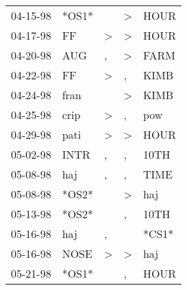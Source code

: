 \begin{supertabular}{p{0.07\textwidth}p{0.06\textwidth}p{0.02\textwidth}p{0.02\textwidth}p{0.06\textwidth}}
          04-15-98\textsuperscript{} &                            *OS1* &                  &     \textgreater &           HOUR\textsuperscript{} \\
          04-17-98\textsuperscript{} &             FF\textsuperscript{} &     \textgreater &     \textgreater &           HOUR\textsuperscript{} \\
          04-20-98\textsuperscript{} &            AUG\textsuperscript{} &                , &     \textgreater &           FARM\textsuperscript{} \\
          04-22-98\textsuperscript{} &             FF\textsuperscript{} &     \textgreater &                , &           KIMB\textsuperscript{} \\
          04-24-98\textsuperscript{} &           fran\textsuperscript{} &                  &     \textgreater &           KIMB\textsuperscript{} \\
          04-25-98\textsuperscript{} &           crip\textsuperscript{} &     \textgreater &                , &            pow\textsuperscript{} \\
          04-29-98\textsuperscript{} &           pati\textsuperscript{} &     \textgreater &     \textgreater &           HOUR\textsuperscript{} \\
          05-02-98\textsuperscript{} &           INTR\textsuperscript{} &                , &                , &           10TH\textsuperscript{} \\
          05-08-98\textsuperscript{} &            haj\textsuperscript{} &                , &                , &           TIME\textsuperscript{} \\
          05-08-98\textsuperscript{} &                            *OS2* &                  &     \textgreater &            haj\textsuperscript{} \\
          05-13-98\textsuperscript{} &                            *OS2* &                  &                , &           10TH\textsuperscript{} \\
          05-16-98\textsuperscript{} &            haj\textsuperscript{} &                , &                  &                            *CS1* \\
          05-16-98\textsuperscript{} &           NOSE\textsuperscript{} &     \textgreater &     \textgreater &            haj\textsuperscript{} \\
          05-21-98\textsuperscript{} &                            *OS1* &                  &                , &           HOUR\textsuperscript{} \\

\end{supertabular}
